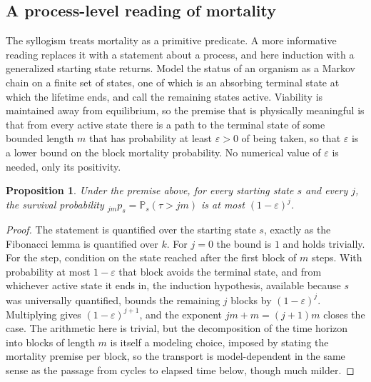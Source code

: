 \documentclass[11pt]{article}
\newtheorem{proposition}{Proposition}
\theoremstyle{definition}
\theoremstyle{remark}
\renewcommand{\Pr}{\mathbb{P}}
\begin{document}
\subsection{A process-level reading of mortality}

The syllogism treats mortality as a primitive predicate. A more informative reading replaces it with a statement about a process, and here induction with a generalized starting state returns. Model the status of an organism as a Markov chain on a finite set of states, one of which is an absorbing terminal state at which the lifetime ends, and call the remaining states active. Viability is maintained away from equilibrium, so the premise that is physically meaningful is that from every active state there is a path to the terminal state of some bounded length $m$ that has probability at least $\varepsilon > 0$ of being taken, so that $\varepsilon$ is a lower bound on the block mortality probability. No numerical value of $\varepsilon$ is needed, only its positivity.

\begin{proposition}\label{prop:decay}
Under the premise above, for every starting state $s$ and every $j$, the survival probability ${}_{jm}p_{s} = \Pr_s(\tau > jm)$ is at most $(1-\varepsilon)^j$.
\end{proposition}

\begin{proof}
The statement is quantified over the starting state $s$, exactly as the Fibonacci lemma is quantified over $k$. For $j = 0$ the bound is $1$ and holds trivially. For the step, condition on the state reached after the first block of $m$ steps. With probability at most $1-\varepsilon$ that block avoids the terminal state, and from whichever active state it ends in, the induction hypothesis, available because $s$ was universally quantified, bounds the remaining $j$ blocks by $(1-\varepsilon)^j$. Multiplying gives $(1-\varepsilon)^{j+1}$, and the exponent $jm + m = (j+1)m$ closes the case. The arithmetic here is trivial, but the decomposition of the time horizon into blocks of length $m$ is itself a modeling choice, imposed by stating the mortality premise per block, so the transport is model-dependent in the same sense as the passage from cycles to elapsed time below, though much milder.
\end{proof}
\end{document}

